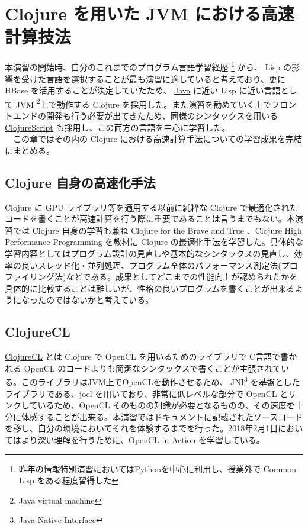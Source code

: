 \documentclass{scrartcl}
\begin{document}
\newpage
\section{Clojure を用いた JVM における高速計算技法}
\label{sec:org7344452}
本演習の開始時、自分のこれまでのプログラム言語学習経歴 \footnote{昨年の情報特別演習においてはPythonを中心に利用し、授業外で Common Lisp をある程度習得した} から、 Lisp の影響を受けた言語を選択することが最も演習に適していると考えており、更に HBase を活用することが決定していたため、 \href{https://www.java.com}{Java} に近い Lisp に近い言語として JVM \footnote{Java virtual machine}上で動作する \href{https://clojure.org}{Clojure} を採用した。また演習を勧めていく上でフロントエンドの開発も行う必要が出てきたため、同様のシンタックスを用いる \href{https://clojurescript.org}{ClojureScript} も採用し、この両方の言語を中心に学習した。\\
　この章ではその内の Clojure における高速計算手法についての学習成果を完結にまとめる。\\

\subsection{Clojure 自身の高速化手法}
\label{sec:org16f84e5}
Clojure に GPU ライブラリ等を適用する以前に純粋な Clojure で最適化されたコードを書くことが高速計算を行う際に重要であることは言うまでもない。本演習では Clojure 自身の学習も兼ね Clojure for the Brave and True \cite{Brave} 、Clojure High Performance Programming \cite{high-performance} を教材に Clojure の最適化手法を学習した。具体的な学習内容としてはプログラム設計の見直しや基本的なシンタックスの見直し、効率の良いスレッド化・並列処理、プログラム全体のパフォーマンス測定法(プロファイリング法)などである。成果としてどこまでの性能向上が認められたかを具体的に比較することは難しいが、性格の良いプログラムを書くことが出来るようになったのではないかと考えている。\\

\subsection{ClojureCL}
\label{sec:orgb011387}
\href{http://clojurecl.uncomplicate.org/}{ClojureCL} とは Clojure で OpenCL を用いるためのライブラリで C言語で書かれる OpenCL のコードよりも簡潔なシンタックスで書くことが主張されている。このライブラリはJVM上でOpenCLを動作させるため、 JNI\footnote{Java Native Interface} を基盤としたライブラリである、jocl を用いており、非常に低レベルな部分で OpenCL とリンクしているため、OpenCL そのものの知識が必要となるものの、その速度を十分に体感することが出来る。本演習ではドキュメントに記載されたソースコードを移し、自分の環境においてそれを体験するまでを行った。2018年2月1日においてはより深い理解を行うために、OpenCL in Action \cite{OpenCL} を学習している。\\
\end{document}
